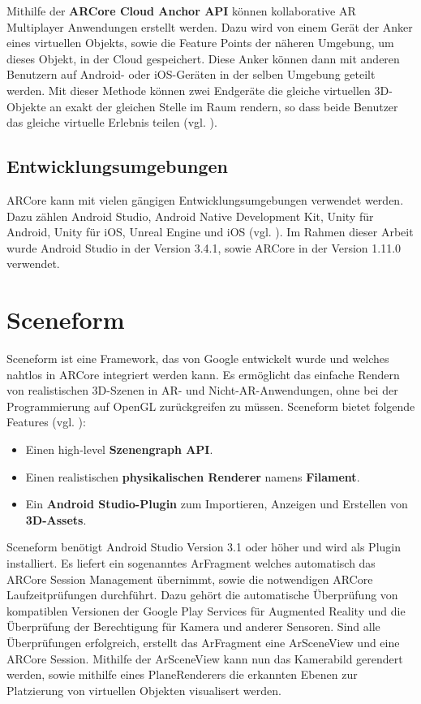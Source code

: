 Mithilfe der \textbf{ARCore Cloud Anchor API} können kollaborative AR Multiplayer Anwendungen erstellt werden. Dazu wird von einem Gerät der Anker eines virtuellen Objekts, sowie die Feature Points der näheren Umgebung, um dieses Objekt, in der Cloud gespeichert. Diese Anker können dann mit anderen Benutzern auf Android- oder iOS-Geräten in der selben Umgebung geteilt werden. Mit dieser Methode können zwei Endgeräte die gleiche virtuellen 3D-Objekte an exakt der gleichen Stelle im Raum rendern, so dass beide Benutzer das gleiche virtuelle Erlebnis teilen (vgl. \cite{fundamental_concepts}).

\subsection{Entwicklungsumgebungen}

ARCore kann mit vielen gängigen Entwicklungsumgebungen verwendet werden. Dazu zählen Android Studio, Android Native Development Kit, Unity für Android, Unity für iOS, Unreal Engine und iOS (vgl. \cite{develop}). Im Rahmen dieser Arbeit wurde Android Studio in der Version 3.4.1, sowie ARCore in der Version 1.11.0 verwendet.

\section{Sceneform}
Sceneform ist eine Framework, das von Google entwickelt wurde und welches nahtlos in ARCore integriert werden kann. Es ermöglicht das einfache Rendern von realistischen 3D-Szenen in AR- und Nicht-AR-Anwendungen, ohne bei der Programmierung auf OpenGL zurückgreifen zu müssen. Sceneform bietet folgende Features (vgl. \cite{sceneform}):

\begin{itemize}
\item Einen \glqq high-level\grqq{} \textbf{Szenengraph API}.
\item Einen realistischen \textbf{physikalischen Renderer} namens \textbf{Filament}.
\item Ein \textbf{Android Studio-Plugin} zum Importieren, Anzeigen und Erstellen von \textbf{3D-Assets}.
\end{itemize}

Sceneform benötigt Android Studio Version 3.1 oder höher und wird als Plugin installiert. Es liefert ein sogenanntes \glqq ArFragment\grqq{} welches automatisch das ARCore Session Management übernimmt, sowie die notwendigen ARCore Laufzeitprüfungen durchführt. Dazu gehört die automatische Überprüfung von kompatiblen Versionen der Google Play Services für Augmented Reality und die Überprüfung der Berechtigung für Kamera und anderer Sensoren. Sind alle Überprüfungen erfolgreich, erstellt das ArFragment eine \glqq ArSceneView\grqq{} und eine ARCore Session. Mithilfe der ArSceneView kann nun das Kamerabild gerendert werden, sowie mithilfe eines \glqq PlaneRenderers\grqq{} die erkannten Ebenen zur Platzierung von virtuellen Objekten visualisert werden.

